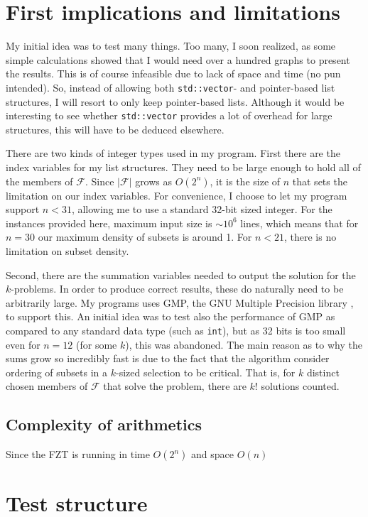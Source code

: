 \documentclass[a4paper, titlepage]{article}
\newcommand{\code}{\texttt}
\begin{document}
\section{First implications and limitations}
My initial idea was to test many things. Too many, I soon realized, as some simple calculations showed that I would need over a hundred graphs to present the results. This is of course infeasible due to lack of space and time (no pun intended). So, instead of allowing both \code{std::vector}- and pointer-based list structures, I will resort to only keep pointer-based lists. Although it would be interesting to see whether \code{std::vector} provides a lot of overhead for large structures, this will have to be deduced elsewhere.

There are two kinds of integer types used in my program. First there are the index variables for my list structures. They need to be large enough to hold all of the members of $\mathcal{F}$. Since $|\mathcal{F}|$ grows as $O(2^n)$, it is the size of $n$ that sets the limitation on our index variables. For convenience, I choose to let my program support $n < 31$, allowing me to use a standard 32-bit sized integer. For the instances provided here, maximum input size is $\sim 10^6$ lines, which means that for $n=30$ our maximum density of subsets is around 1\permil. For $n<21$, there is no limitation on subset density.

Second, there are the summation variables needed to output the solution for the $k$-problems. In order to produce correct results, these do naturally need to be arbitrarily large. My programs uses GMP, the GNU Multiple Precision library \cite{gmp}, to support this. An initial idea was to test also the performance of GMP as compared to any standard data type (such as \code{int}), but as 32 bits is too small even for $n=12$ (for some $k$), this was abandoned. The main reason as to why the sums grow so incredibly fast is due to the fact that the algorithm consider ordering of subsets in a $k$-sized selection to be critical. That is, for $k$ distinct chosen members of $\mathcal{F}$ that solve the problem, there are $k!$ solutions counted.

\subsection{Complexity of arithmetics}
Since the FZT is running in time $O(2^n)$ and space $O(n)$

\section{Test structure}
\end{document}
